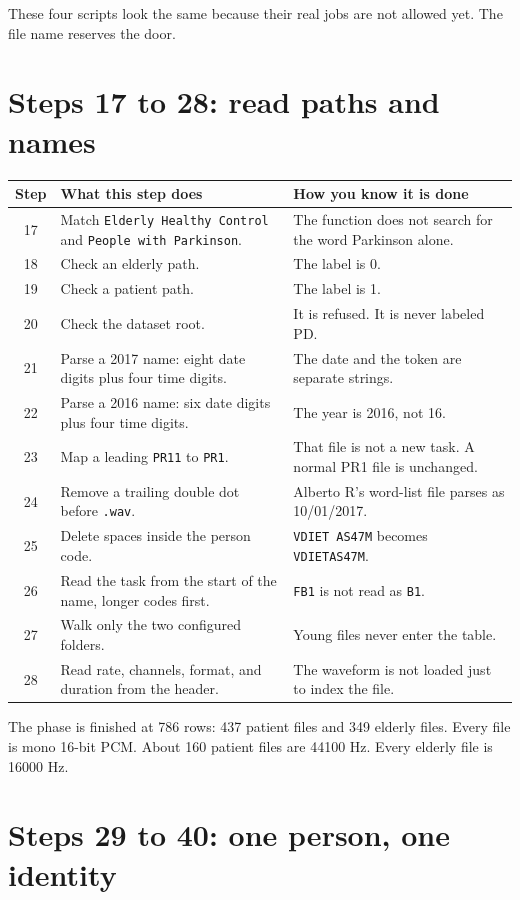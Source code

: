\documentclass[11pt]{article}
\begin{document}
These four scripts look the same because their real jobs are not allowed yet. The file name reserves the door.

\section{Steps 17 to 28: read paths and names}

\begin{longtable}{cp{6.4cm}p{6.4cm}}
\toprule
Step & What this step does & How you know it is done \\
\midrule
\endhead
17 & Match \texttt{Elderly Healthy Control} and \texttt{People with Parkinson}. & The function does not search for the word Parkinson alone. \\
18 & Check an elderly path. & The label is 0. \\
19 & Check a patient path. & The label is 1. \\
20 & Check the dataset root. & It is refused. It is never labeled PD. \\
21 & Parse a 2017 name: eight date digits plus four time digits. & The date and the token are separate strings. \\
22 & Parse a 2016 name: six date digits plus four time digits. & The year is 2016, not 16. \\
23 & Map a leading \texttt{PR11} to \texttt{PR1}. & That file is not a new task. A normal PR1 file is unchanged. \\
24 & Remove a trailing double dot before \texttt{.wav}. & Alberto R's word-list file parses as 10/01/2017. \\
25 & Delete spaces inside the person code. & \texttt{VDIET AS47M} becomes \texttt{VDIETAS47M}. \\
26 & Read the task from the start of the name, longer codes first. & \texttt{FB1} is not read as \texttt{B1}. \\
27 & Walk only the two configured folders. & Young files never enter the table. \\
28 & Read rate, channels, format, and duration from the header. & The waveform is not loaded just to index the file. \\
\bottomrule
\end{longtable}

The phase is finished at 786 rows: 437 patient files and 349 elderly files. Every file is mono 16-bit PCM. About 160 patient files are 44100 Hz. Every elderly file is 16000 Hz.

\section{Steps 29 to 40: one person, one identity}
\end{document}
